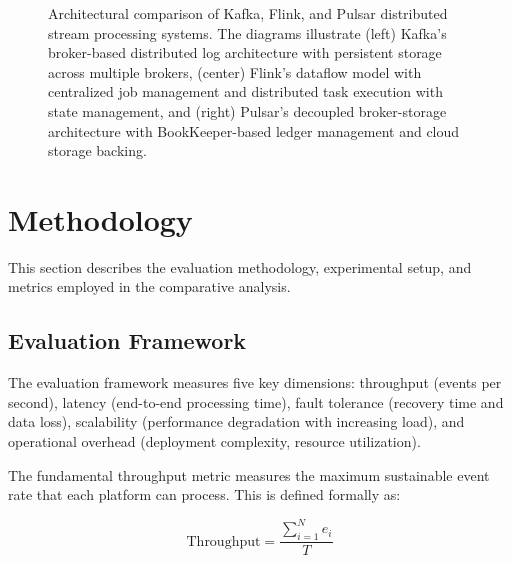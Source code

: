 \documentclass[10pt,twocolumn]{article}
\begin{document}
\begin{figure}[htb]
{
}
\caption{Architectural comparison of Kafka, Flink, and Pulsar distributed stream processing systems. The diagrams illustrate (left) Kafka's broker-based distributed log architecture with persistent storage across multiple brokers, (center) Flink's dataflow model with centralized job management and distributed task execution with state management, and (right) Pulsar's decoupled broker-storage architecture with BookKeeper-based ledger management and cloud storage backing.}
\label{fig:architecture}
\end{figure}

\section{Methodology}

This section describes the evaluation methodology, experimental setup, and metrics employed in the comparative analysis.

\subsection{Evaluation Framework}

The evaluation framework measures five key dimensions: throughput (events per second), latency (end-to-end processing time), fault tolerance (recovery time and data loss), scalability (performance degradation with increasing load), and operational overhead (deployment complexity, resource utilization).

The fundamental throughput metric measures the maximum sustainable event rate that each platform can process. This is defined formally as:

\begin{equation}
\text{Throughput} = \frac{\sum_{i=1}^{N} e_i}{T}
\end{equation}
\end{document}
